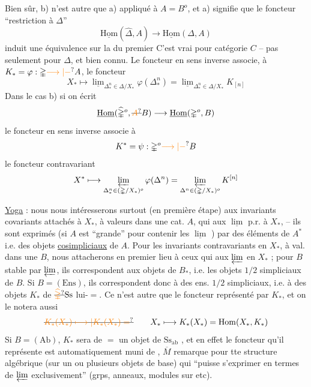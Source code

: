 Bien sûr, b) n'est autre que a) appliqué à $A=B^o$, et a) signifie que le foncteur ``restriction à $\mathbb{\Delta}$''
\[
 \underline{\mathrm{Hom}}(\widehat{\mathbb{\Delta}},A)\longrightarrow\underline{\mathrm{Hom}}(\mathbb{\Delta},A)
\]
induit une équivalence sur la    du premier  C'est vrai pour \uline{}   catégorie $C$ -- pas seulement pour $\mathbb{\Delta}$, et bien connu. Le foncteur en sens inverse associe, à $K_*=\varphi:\mathbb{\Delta}\unsure{\longrightarrow|-} A$, le foncteur
\[
 X_*\longmapsto
 \underline{\lim}_{\Delta^n_*\in\mathbb{\Delta}/X_*}\varphi(\Delta^n_*)
 =\underline{\lim}_{\Delta^n_*\in\mathbb{\Delta}/X_*}K_{[n]}
\]
Dans le cas b) si on écrit
\[
 \underline{\mathrm{Hom}}(\widehat{\mathbb{\Delta}}^o,\deleted{\unsure{A}}B)\longrightarrow
 \underline{\mathrm{Hom}}(\mathbb{\Delta}^o,B)
\]
le foncteur en sens inverse associe à
\[
 K^*=\psi:\mathbb{\Delta}^o\unsure{\longrightarrow|-}B
\]
le foncteur contravariant
\[
 X^*\longmapsto\varprojlim_{\Delta^n_*\in(\mathbb{\Delta}/X_*)^o}\varphi(\Delta^n)
 =\varprojlim_{\Delta^n\in(\mathbb{\Delta}/X_*)^o}K^{[n]}
\]

\uline{Yoga} : nous nous intéresserons surtout  (en première étape) aux invariants covariants attachés à $X_*$, à valeurs dans une cat. $A$, qui   aux $\underline{\lim}$ p.r. à $X_*$, -- ils sont  exprimés (si $A$ est ``grande'' pour contenir les $\underline{\lim}$ ) par des éléments de $A^*$ i.e. des objets \uline{cosimpliciaux} de $A$. Pour les invariants contravariants en $X_*$, à val. dans une $B$,  nous attacherons en premier lieu à ceux qui  aux $\varprojlim$ en $X_*$ ; pour $B$ stable par $\varprojlim$, ils correspondent  aux objets de $B_*$, i.e. les objets $1/2$ simpliciaux de $B$. Si $B=(\mathrm{Ens})$, ils correspondent donc à des ens. $1/2$ simpliciaux, i.e. à des objets $K_*$ de $\deleted{\unsure{\widehat{\mathbb{\Delta}}}}\mathrm{Ss}$ lui-$=$.
Ce n'est autre que le foncteur représenté par $K_*$, et on le notera aussi
\[
 \deleted{\unsure{K_*(X_*)\longmapsto|K_*(X_*)=}}\qquad
 X_*\longmapsto K_*(X_*)=\mathrm{Hom}(X_*,K_*)
\]
Si $B=(\mathrm{Ab})$, $K_*$ sera de $=$ un objet de $\mathrm{Ss}_{\mathrm{ab}}$ , et en effet le foncteur qu'il représente est automatiquement muni de   , $\overline{M}$ remarque pour tte structure algébrique (sur un ou plusieurs objets de base) qui ``puisse s'exprimer en termes de $\varprojlim$ exclusivement'' (grps,  anneaux, modules sur  etc).

